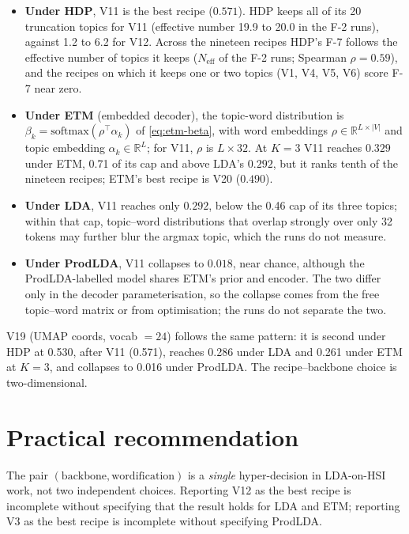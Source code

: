 \documentclass[journal,a4paper,10pt]{IEEEtran}
\begin{document}
\begin{itemize}
  \item \textbf{Under HDP}, V11 is the best recipe ($0.571$). HDP keeps
    all of its 20 truncation topics for V11 (effective number 19.9 to
    20.0 in the F-2 runs), against 1.2 to 6.2 for V12. Across the
    nineteen recipes HDP's F-7 follows the effective number of topics
    it keeps ($N_{\mathrm{eff}}$ of the F-2 runs; Spearman
    $\rho = 0.59$), and the recipes on which it keeps one or
    two topics (V1, V4, V5, V6) score F-7 near zero.
  \item \textbf{Under ETM} (embedded decoder), the topic-word
    distribution is $\beta_k = \mathrm{softmax}(\rho^{\top}\alpha_k)$
    of \eqref{eq:etm-beta}, with word embeddings
    $\rho \in \mathbb{R}^{L \times |V|}$ and topic embedding
    $\alpha_k \in \mathbb{R}^{L}$; for V11, $\rho$ is $L \times 32$.
    At $K = 3$ V11 reaches $0.329$ under ETM, 0.71 of its cap and above
    LDA's $0.292$, but it ranks tenth of the nineteen recipes; ETM's
    best recipe is V20 ($0.490$).
  \item \textbf{Under LDA}, V11 reaches only $0.292$, below the 0.46
    cap of its three topics; within that cap, topic--word distributions
    that overlap strongly over only 32 tokens may further blur the
    argmax topic, which the runs do not measure.
  \item \textbf{Under ProdLDA}, V11 collapses to $0.018$, near
    chance, although the ProdLDA-labelled model shares ETM's prior and
    encoder. The two differ only in the decoder parameterisation, so
    the collapse comes from the free topic--word matrix or from
    optimisation; the runs do not separate the two.
\end{itemize}

V19 (UMAP coords, vocab $= 24$) follows the same pattern: it is
second under HDP at 0.530, after V11 (0.571), reaches 0.286 under LDA
and 0.261 under ETM at $K = 3$, and collapses to 0.016 under ProdLDA.
The recipe--backbone choice is two-dimensional.

\section{Practical recommendation}\label{sec:recommendation}

The pair $(\text{backbone}, \text{wordification})$ is a \emph{single}
hyper-decision in LDA-on-HSI work, not two independent choices.
Reporting V12 as the best recipe is incomplete without specifying that
the result holds for LDA and ETM; reporting V3 as the best recipe is
incomplete without specifying ProdLDA.
\end{document}
